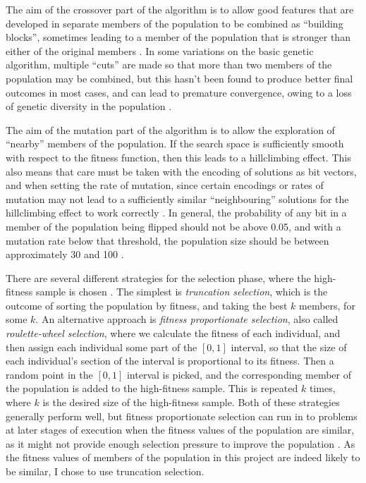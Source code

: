 \documentclass[pdftex,11pt,a4]{article}
\begin{document}
The aim of the crossover part of the algorithm is to allow good features that are developed in separate members of the population to be combined as ``building blocks'', sometimes leading to a member of the population that is stronger than either of the original members \cite{Goldberg:1989}. In some variations on the basic genetic algorithm, multiple ``cuts'' are made so that more than two members of the population may be combined, but this hasn't been found to produce better final outcomes in most cases, and can lead to premature convergence, owing to a loss of genetic diversity in the population \cite{Esquivel:1997}.

The aim of the mutation part of the algorithm is to allow the exploration of ``nearby'' members of the population. If the search space is sufficiently smooth with respect to the fitness function, then this leads to a hillclimbing effect. This also means that care must be taken with the encoding of solutions as bit vectors, and when setting the rate of mutation, since certain encodings or rates of mutation may not lead to a sufficiently similar ``neighbouring'' solutions for the hillclimbing effect to work correctly \cite{Taher:2013}. In general, the probability of any bit in a member of the population being flipped should not be above 0.05, and with a mutation rate below that threshold, the population size should be between approximately 30 and 100 \cite{Grefenstette:1986}.

There are several different strategies for the selection phase, where the high-fitness sample is chosen \cite{Thierens:1994}. The simplest is \emph{truncation selection}, which is the outcome of sorting the population by fitness, and taking the best $k$ members, for some $k$. An alternative approach is \emph{fitness proportionate selection}, also called \emph{roulette-wheel selection}, where we calculate the fitness of each individual, and then assign each individual some part of the $[0,1]$ interval, so that the size of each individual's section of the interval is proportional to its fitness. Then a random point in the $[0,1]$ interval is picked, and the corresponding member of the population is added to the high-fitness sample. This is repeated $k$ times, where $k$ is the desired size of the high-fitness sample. Both of these strategies generally perform well, but fitness proportionate selection can run in to problems at later stages of execution when the fitness values of the population are similar, as it might not provide enough selection pressure to improve the population \cite{Whitley:1989}. As the fitness values of members of the population in this project are indeed likely to be similar, I chose to use truncation selection.
\end{document}
